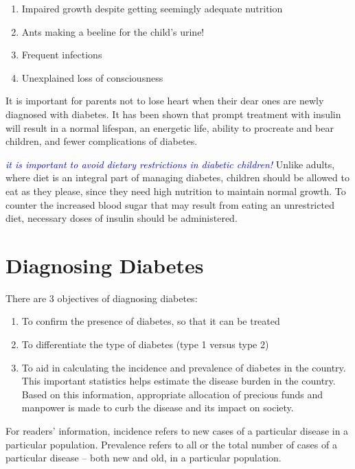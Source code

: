 \begin{enumerate}[\ding{226}]
\itemsep=0pt
\item Impaired growth despite getting seemingly adequate nutrition
\item Ants making a beeline for the child’s urine!
\item Frequent infections
\item Unexplained loss of consciousness
\end{enumerate}

It is important for parents not to lose heart when their dear ones are newly diagnosed with diabetes. It has been shown that prompt treatment with insulin will result in a normal lifespan, an energetic life, ability to procreate and bear children, and fewer complications of diabetes.

\textcolor{blue}{\textit{it is important to avoid dietary restrictions in diabetic children!}} Unlike adults, where diet is an integral part of managing diabetes, children should be allowed to eat as they please, since they need high nutrition to maintain normal growth. To counter the increased blood sugar that may result from eating an unrestricted diet, necessary doses of insulin should be administered.



\chapter{Diagnosing Diabetes}\label{chap5}

There are 3 objectives of diagnosing diabetes:

\begin{enumerate}
\itemsep=0pt
\item To confirm the presence of diabetes, so that it can be treated
\item To differentiate the type of diabetes (type 1 versus type 2)
\item To aid in calculating the incidence and prevalence of diabetes in the country. This important statistics helps estimate the disease burden in the country. Based on this information, appropriate allocation of precious funds and manpower is made to curb the disease and its impact on society.
\end{enumerate}

For readers’ information, incidence refers to new cases of a parti\-cular disease in a particular population. Prevalence refers to all or the total number of cases of a particular disease – both new and old, in a particular population.

